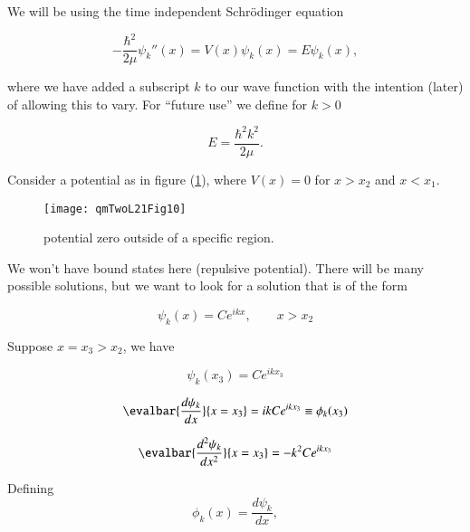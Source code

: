 We will be using the time independent Schr\"{o}dinger equation

\begin{equation}\label{eqn:qmTwoL21:430}
- \frac{\hbar^2}{2 \mu} \psi_k''(x) = V(x) \psi_k(x) = E \psi_k(x),
\end{equation}

where we have added a subscript $k$ to our wave function with the intention (later) of allowing this to vary.  For ``future use'' we define for $k > 0$

\begin{equation}\label{eqn:qmTwoL21:450}
E = \frac{\hbar^2 k^2}{2 \mu}.
\end{equation}

Consider a potential as in figure (\ref{fig:qmTwoL21:qmTwoL21Fig10}), where $V(x) = 0$ for $x > x_2$ and $x < x_1$.

\begin{figure}[htp]
   \centering
   \texttt{[image: qmTwoL21Fig10]}
   \caption{potential zero outside of a specific region.}\label{fig:qmTwoL21:qmTwoL21Fig10}
\end{figure}

We won't have bound states here (repulsive potential).  There will be many possible solutions, but we want to look for a solution that is of the form

\begin{equation}\label{eqn:qmTwoL21:470}
\psi_k(x) = C e^{i k x}, \qquad x > x_2
\end{equation}

Suppose $x = x_3 > x_2$, we have 

\begin{equation}\label{eqn:qmTwoL21:490}
\psi_k(x_3) = C e^{i k x_3}
\end{equation}

\begin{equation}\label{eqn:qmTwoL21:510}
\evalbar{\frac{d\psi_k}{dx}}{x = x_3} = i k C e^{i k x_3} \equiv \phi_k(x_3)
\end{equation}

\begin{equation}\label{eqn:qmTwoL21:530}
\evalbar{\frac{d^2\psi_k}{dx^2}}{x = x_3} = -k^2 C e^{i k x_3} 
\end{equation}

Defining
\begin{equation}\label{eqn:qmTwoL21:550}
\phi_k(x) = \frac{d\psi_k}{dx},
\end{equation}

